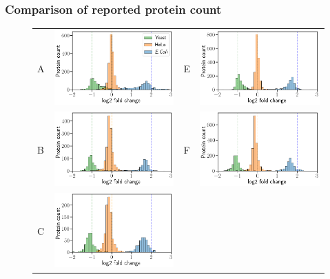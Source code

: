 \documentclass[11pt]{article}
\begin{document}
\subsubsection*{Comparison of reported protein count}
\begin{figure}[hbt]
    \centering
    \begin{tabular}{lclc} 
        A & \includegraphics[width=0.4\linewidth]{../../result/report_plots_filtered/osw_triqler_intensity.png} & 
        E & \includegraphics[width=0.4\linewidth]{../../result/report_plots_filtered/diann_triqler_intensity.png} \\ 
        B & \includegraphics[width=0.4\linewidth]{../../result/report_plots_filtered/osw_msqrobsum_intensity.png} & 
        F & \includegraphics[width=0.4\linewidth]{../../result/report_plots_filtered/diann_msqrobsum_intensity.png} \\ 
        C & \includegraphics[width=0.4\linewidth]{../../result/report_plots_filtered/osw_msstats_intensity.png} & 

\end{tabular}
\end{figure}
\end{document}
